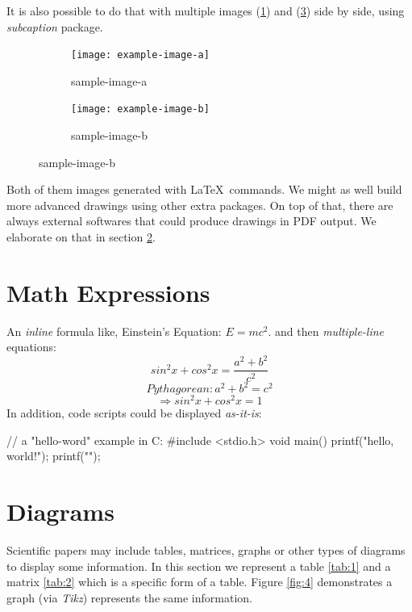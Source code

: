 \documentclass[twocolumn]{article} %
\begin{document}
It is also possible to do that with multiple images (\ref{fig:2}) and
(\ref{fig:3}) side by side, using \textit{subcaption} package.
\begin{figure}[h!]
\centering
\begin{subfigure}[b]{0.4\linewidth}
\texttt{[image: example-image-a]}
\caption{sample-image-a}
\label{fig:2}
\end{subfigure}
\begin{subfigure}[b]{0.4\linewidth}
\texttt{[image: example-image-b]}
\caption{sample-image-b}
\label{fig:3}
\end{subfigure}
\end{figure}

Both of them images generated with \LaTeX\ commands. We might as well build more
advanced drawings using other extra packages. On top of that, there are always
external softwares that could produce drawings in PDF output. We elaborate on
that in section \ref{sec:1}.
\section{Math Expressions}
An \textit{inline} formula like, Einstein's Equation: $E = mc^2$. and then
\textit{multiple-line} equations:
\begin{equation*}
sin^2x + cos^2x = \frac{a^2 + b^2}{c^2}
\end{equation*}
\begin{equation*}
Pythagorean: a^2 + b^2 = c^2
\end{equation*}
\begin{equation*}
\Rightarrow sin^2x + cos^2x = 1
\end{equation*}
In addition, code scripts could be displayed \textit{as-it-is}:
\begin{verbatimtab}
// a "hello-word" example in C:
#include <stdio.h>
void main() {
	printf("hello, world!");
	printf("\n");
}
\end{verbatimtab}
\section{Diagrams}
\label{sec:1}
Scientific papers may include tables, matrices, graphs or other types of
diagrams to display some information. In this section we represent a table
\ref{tab:1} and a matrix \ref{tab:2} which is a specific form of a table. Figure
\ref{fig:4} demonstrates a graph (via \textit{Tikz}) represents the same
information.
\end{document}
